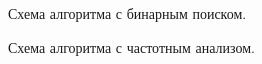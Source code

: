 \documentclass[12pt,a4paper]{report}
\begin{document}
\begin{figure}[ht!]
	\caption{Схема алгоритма с бинарным поиском.}
\end{figure}

\begin{figure}[ht!]
	\caption{Схема алгоритма с частотным анализом.}
\end{figure}
\end{document}
